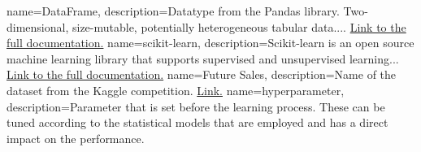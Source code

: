 
{
    name=DataFrame,
    description={Datatype from the Pandas library. Two-dimensional, size-mutable, potentially heterogeneous tabular data.... \href{https://pandas.pydata.org/pandas-docs/stable/reference/api/pandas.DataFrame.html}{Link to the full documentation.}}
}
{
    name=scikit-learn,
    description={Scikit-learn is an open source machine learning library that supports supervised and unsupervised learning... \href{https://scikit-learn.org/stable/getting_started.html}{Link to the full documentation.}}
}
{
    name=Future Sales,
    description={Name of the dataset from the Kaggle competition. \href{https://www.kaggle.com/c/competitive-data-science-predict-future-sales/}{Link.}}
}
{
    name=hyperparameter,
    description={Parameter that is set before the learning process. These can be tuned according to the statistical models that are employed and has a direct impact on the performance.}
}
